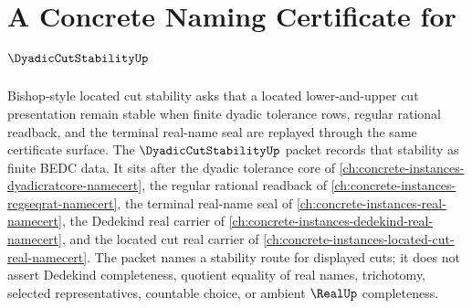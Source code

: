 \chapter{A Concrete Naming Certificate for $\DyadicCutStabilityUp$}
\label{ch:concrete-instances-dyadic-cut-stability-namecert}

Bishop-style located cut stability asks that a located lower-and-upper cut presentation remain stable when finite dyadic tolerance rows, regular rational readback, and the terminal real-name seal are replayed through the same certificate surface. The $\DyadicCutStabilityUp$ packet records that stability as finite BEDC data. It sits after the dyadic tolerance core of \autoref{ch:concrete-instances-dyadicratcore-namecert}, the regular rational readback of \autoref{ch:concrete-instances-regseqrat-namecert}, the terminal real-name seal of \autoref{ch:concrete-instances-real-namecert}, the Dedekind real carrier of \autoref{ch:concrete-instances-dedekind-real-namecert}, and the located cut real carrier of \autoref{ch:concrete-instances-located-cut-real-namecert}. The packet names a stability route for displayed cuts; it does not assert Dedekind completeness, quotient equality of real names, trichotomy, selected representatives, countable choice, or ambient $\RealUp$ completeness.

